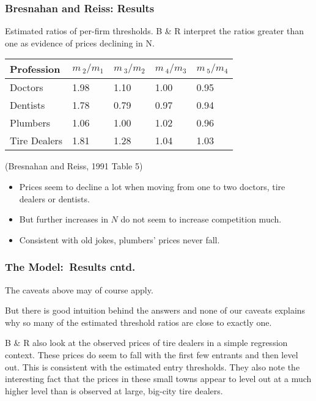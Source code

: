 \begin{frame}
\frametitle{Bresnahan and Reiss: Results}
Estimated ratios of per-firm thresholds. B \& R interpret the ratios greater
than one as evidence of prices declining in N.
\begin{center}
\begin{tabular}{|l|l|l|l|l|}
\hline
Profession & $m\,_{2}/m_{1}$ & $m\,_{3}/m_{2}$ & $m\,_{4}/m_{3}$ & $m\,_{5}/m_{4}$ \\ \hline
Doctors & 1.98 & 1.10 & 1.00 & 0.95 \\ \hline
Dentists & 1.78 & 0.79 & 0.97 & 0.94 \\ \hline
Plumbers & 1.06 & 1.00 & 1.02 & 0.96 \\ \hline
Tire Dealers & 1.81 & 1.28 & 1.04 & 1.03 \\ \hline
\end{tabular}
\end{center}
(Bresnahan and Reiss, 1991 Table 5\bigskip )
\begin{itemize}
\item Prices seem to decline a lot when moving from one to two doctors, tire
dealers or dentists.
\item But further increases in $N$ do not seem to increase competition much.
\item Consistent with old jokes, plumbers' prices never fall.
\end{itemize}
\end{frame}


\begin{frame}
\frametitle{The Model:\ Results cntd.}
The caveats above may of course apply.

\bigskip
But there is good intuition behind the answers and none of our caveats
explains why so many of the estimated threshold ratios are close to exactly
one.

\bigskip
B \& R also look at the observed prices of tire dealers in a simple
regression context. These prices do seem to fall with the first few entrants
and then level out. This is consistent with the estimated entry thresholds.
They also note the interesting fact that the prices in these small towns
appear to level out at a much higher level than is observed at large,
big-city tire dealers.
\end{frame}

